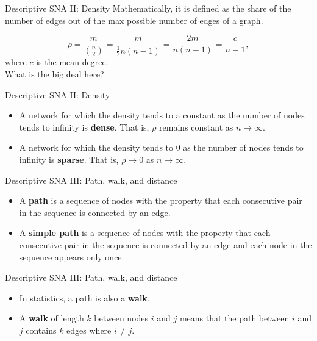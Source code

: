 \documentclass[10pt]{beamer}
\begin{document}
\begin{frame}{Descriptive SNA II: Density}
Mathematically, it is defined as the share of the number of edges out of the max possible number of edges of a graph.

	\begin{equation}
	\rho = \frac{m}{\binom{n}{2}}  = \frac{m}{\frac{1}{2} n(n-1)} = \frac{2m}{n(n-1)}  = \frac{c}{n-1},
	\end{equation}
where $c$ is the mean degree.\\

\vspace{0.3cm}
What is the big deal here?	
\end{frame}

\begin{frame}{Descriptive SNA II: Density}
	\begin{itemize}
		\item A network for which the density tends to a constant as the number of nodes tends to infinity is \textbf{dense}. That is, $\rho$ remains constant as $n \to \infty$.
		
		\item A network for which the density tends to 0 as the number of nodes tends to infinity is \textbf{sparse}. That is, $\rho \to 0$ as $n \to \infty$.
	\end{itemize}
\end{frame}

\begin{frame}{Descriptive SNA III: Path, walk, and distance}
	\begin{itemize}
		\item A \textbf{path} is a sequence of nodes with the property that each consecutive pair in the sequence is connected by an edge.
		\item A \textbf{simple path} is a sequence of nodes with the property that each consecutive pair in the sequence is connected by an edge and each node in the sequence appears only once.
	\end{itemize}
\end{frame}

\begin{frame}{Descriptive SNA III: Path, walk, and distance}
	\begin{itemize}
		\item In statistics, a path is also a \textbf{walk}.
		
		\item A \textbf{walk} of length $k$ between nodes $i$ and $j$ means that the path between $i$ and $j$ contains $k$ edges where $i\neq j$.
	\end{itemize}
\end{frame}
\end{document}
